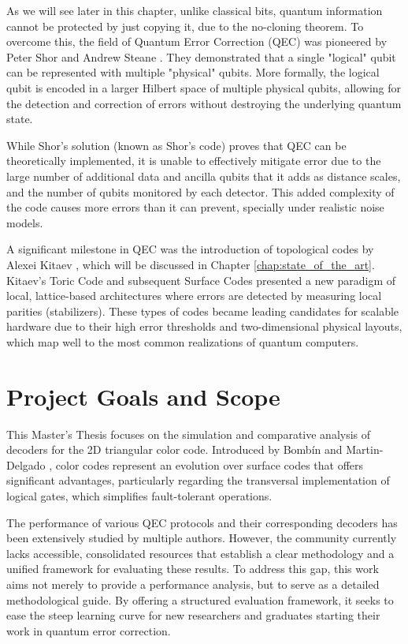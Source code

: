 As we will see later in this chapter, unlike classical bits, quantum information cannot be protected by just copying it, due to the no-cloning theorem. To overcome this, the field of Quantum Error Correction (QEC) was pioneered by Peter Shor \cite{shor1995scheme} and Andrew Steane \cite{steane1996error}. They demonstrated that a single "logical" qubit can be represented with multiple "physical" qubits. More formally, the logical qubit is encoded in a larger Hilbert space of multiple physical qubits, allowing for the detection and correction of errors without destroying the underlying quantum state.

While Shor's solution (known as Shor's code) proves that QEC can be theoretically implemented, it is unable to effectively mitigate error due to the large number of additional data and ancilla qubits that it adds as distance scales, and the number of qubits monitored by each detector. This added complexity of the code causes more errors than it can prevent, specially under realistic noise models. 

A significant milestone in QEC was the introduction of topological codes by Alexei Kitaev \cite{kitaev2003fault}, which will be discussed in Chapter \ref{chap:state_of_the_art}. Kitaev's Toric Code and subsequent Surface Codes presented a new paradigm of local, lattice-based architectures where errors are detected by measuring local parities (stabilizers). These types of codes became leading candidates for scalable hardware due to their high error thresholds and two-dimensional physical layouts, which map well to the most common realizations of quantum computers.

\section{Project Goals and Scope}
This Master’s Thesis focuses on the simulation and comparative analysis of decoders for the 2D triangular color code. Introduced by Bombín and Martin-Delgado \cite{bombin_martindelgado_2006}, color codes represent an evolution over surface codes that offers significant advantages, particularly regarding the transversal implementation of logical gates, which simplifies fault-tolerant operations.

The performance of various QEC protocols and their corresponding decoders has been extensively studied by multiple authors. However, the community currently lacks accessible, consolidated resources that establish a clear methodology and a unified framework for evaluating these results. To address this gap, this work aims not merely to provide a performance analysis, but to serve as a detailed methodological guide. By offering a structured evaluation framework, it seeks to ease the steep learning curve for new researchers and graduates starting their work in quantum error correction.

